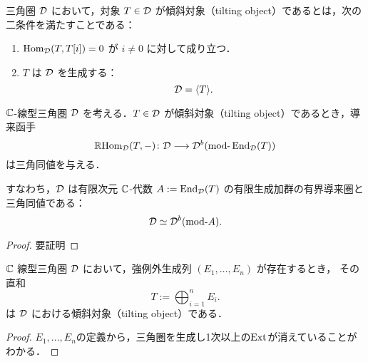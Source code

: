 \begin{defn}[傾斜対象]\cite{BK89}
\label{defn:tilting object}
三角圏 \({\mathcal D}\) において，対象 \(T \in {\mathcal D}\) が傾斜対象（tilting object）であるとは，次の二条件を満たすことである：

\begin{enumerate}
  \item \(\operatorname{\mathrm{Hom}}_{{\mathcal D}}(T, T[i]) = 0\) が \(i \ne 0\) に対して成り立つ．
  \item \(T\) は \({\mathcal D}\) を生成する：
  \[
  {\mathcal D} = \langle T \rangle.
  \]
\end{enumerate}

\end{defn}

\begin{thm}\cite{BK89}
\label{thm:derived_equivalence_tilting}
\({\mathbb C}\)-線型三角圏 \({\mathcal D}\) を考える．\(T \in {\mathcal D}\) が傾斜対象（tilting object）であるとき，導来函手
\[
\RHom_{\D}(T, -) \colon \D \longrightarrow \D^b(\mod \End_{\D}(T))
\]
は三角同値を与える．

すなわち，\({\mathcal D}\) は有限次元 \({\mathbb C}\)-代数 \(A := \operatorname{\mathrm{End}}_{{\mathcal D}}(T)\) の有限生成加群の有界導来圏と三角同値である：
\[
\D \simeq \D^b(\mod A).
\]
\end{thm}


\begin{proof}
{\color{red}要証明}
\end{proof}

\begin{thm}\cite{BK89}
\label{thm:tilting_from_exceptional}
\({\mathbb C}\) 線型三角圏 \({\mathcal D}\) において，強例外生成列 \((E_1, \dots, E_n)\) が存在するとき，
その直和
\[
T := \bigoplus_{i=1}^n E_i.
\]
は \({\mathcal D}\) における傾斜対象（tilting object）である．
\end{thm}
\begin{proof}
	$E_1,\ldots,E_n$の定義から，三角圏を生成し1次以上の$\operatorname{\mathrm{Ext}}$が消えていることがわかる．
\end{proof}
